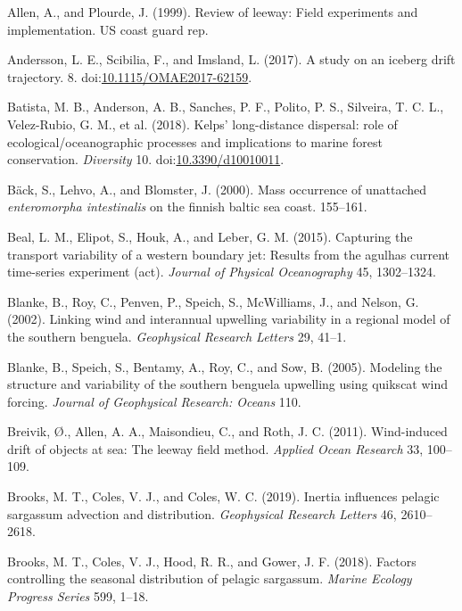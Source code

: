 \documentclass[
]{article}
\begin{document}
\hypertarget{refs}{}
\leavevmode\hypertarget{ref-allen1999}{}%
Allen, A., and Plourde, J. (1999). Review of leeway: Field experiments
and implementation. US coast guard rep.

\leavevmode\hypertarget{ref-andersson2017}{}%
Andersson, L. E., Scibilia, F., and Imsland, L. (2017). A study on an
iceberg drift trajectory. 8.
doi:\href{https://doi.org/10.1115/OMAE2017-62159}{10.1115/OMAE2017-62159}.

\leavevmode\hypertarget{ref-batista2018}{}%
Batista, M. B., Anderson, A. B., Sanches, P. F., Polito, P. S.,
Silveira, T. C. L., Velez-Rubio, G. M., et al. (2018). Kelps'
long-distance dispersal: role of ecological/oceanographic processes and
implications to marine forest conservation. \emph{Diversity} 10.
doi:\href{https://doi.org/10.3390/d10010011}{10.3390/d10010011}.

\leavevmode\hypertarget{ref-back2000}{}%
Bäck, S., Lehvo, A., and Blomster, J. (2000). Mass occurrence of
unattached \emph{enteromorpha intestinalis} on the finnish baltic sea
coast. 155--161.

\leavevmode\hypertarget{ref-beal2015}{}%
Beal, L. M., Elipot, S., Houk, A., and Leber, G. M. (2015). Capturing
the transport variability of a western boundary jet: Results from the
agulhas current time-series experiment (act). \emph{Journal of Physical
Oceanography} 45, 1302--1324.

\leavevmode\hypertarget{ref-blanke2002}{}%
Blanke, B., Roy, C., Penven, P., Speich, S., McWilliams, J., and Nelson,
G. (2002). Linking wind and interannual upwelling variability in a
regional model of the southern benguela. \emph{Geophysical Research
Letters} 29, 41--1.

\leavevmode\hypertarget{ref-blanke2005}{}%
Blanke, B., Speich, S., Bentamy, A., Roy, C., and Sow, B. (2005).
Modeling the structure and variability of the southern benguela
upwelling using quikscat wind forcing. \emph{Journal of Geophysical
Research: Oceans} 110.

\leavevmode\hypertarget{ref-breivik2011}{}%
Breivik, Ø., Allen, A. A., Maisondieu, C., and Roth, J. C. (2011).
Wind-induced drift of objects at sea: The leeway field method.
\emph{Applied Ocean Research} 33, 100--109.

\leavevmode\hypertarget{ref-brooks2019}{}%
Brooks, M. T., Coles, V. J., and Coles, W. C. (2019). Inertia influences
pelagic sargassum advection and distribution. \emph{Geophysical Research
Letters} 46, 2610--2618.

\leavevmode\hypertarget{ref-brooks2018}{}%
Brooks, M. T., Coles, V. J., Hood, R. R., and Gower, J. F. (2018).
Factors controlling the seasonal distribution of pelagic sargassum.
\emph{Marine Ecology Progress Series} 599, 1--18.
\end{document}

